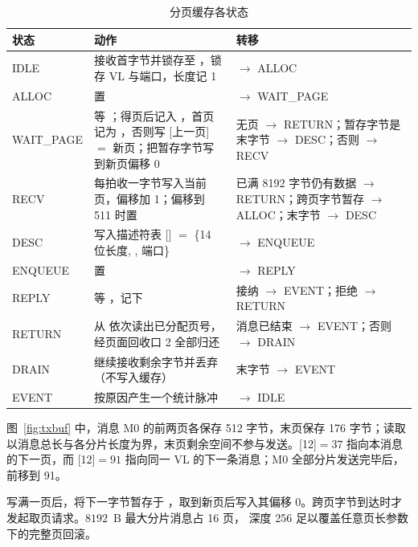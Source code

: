 \begin{table}\centering\small
\caption{分页缓存各状态}\label{tab:txbuffsm}
\begin{tabularx}{\linewidth}{>{\raggedright\arraybackslash}p{2.1cm}L>{\raggedright\arraybackslash}p{4.0cm}}
\toprule
状态 & 动作 & 转移 \\
\midrule
IDLE & 接收首字节并锁存至 ，锁存 VL 与端口，长度记 1 & $\rightarrow$ ALLOC \\
ALLOC & 置  & $\rightarrow$ WAIT\_PAGE \\
WAIT\_PAGE & 等 ；得页后记入 ，首页记为 ，否则写 [上一页] $=$ 新页；把暂存字节写到新页偏移 0 & 无页 $\rightarrow$ RETURN；暂存字节是末字节 $\rightarrow$ DESC；否则 $\rightarrow$ RECV \\
RECV & 每拍收一字节写入当前页，偏移加 1；偏移到 511 时置  & 已满 8192 字节仍有数据 $\rightarrow$ RETURN；跨页字节暂存 $\rightarrow$ ALLOC；末字节 $\rightarrow$ DESC \\
DESC & 写入描述符表 [] $=$ \{14 位长度, , 端口\} & $\rightarrow$ ENQUEUE \\
ENQUEUE & 置  & $\rightarrow$ REPLY \\
REPLY & 等 ，记下  & 接纳 $\rightarrow$ EVENT；拒绝 $\rightarrow$ RETURN \\
RETURN & 从  依次读出已分配页号，经页面回收口 2 全部归还 & 消息已结束 $\rightarrow$ EVENT；否则 $\rightarrow$ DRAIN \\
DRAIN & 继续接收剩余字节并丢弃（不写入缓存） & 末字节 $\rightarrow$ EVENT \\
EVENT & 按原因产生一个统计脉冲 & $\rightarrow$ IDLE \\
\bottomrule
\end{tabularx}
\end{table}

图~\ref{fig:txbuf} 中，消息 M0 的前两页各保存 512 字节，末页保存 176 字节；读取以消息总长与各分片长度为界，末页剩余空间不参与发送。[12]$=37$ 指向本消息的下一页，而 [12]$=91$ 指向同一 VL 的下一条消息；M0 全部分片发送完毕后， 前移到 91。

写满一页后，将下一字节暂存于 ，取到新页后写入其偏移 0。跨页字节到达时才发起取页请求。$8192$~B 最大分片消息占 16 页， 深度 256 足以覆盖任意页长参数下的完整页回滚。

